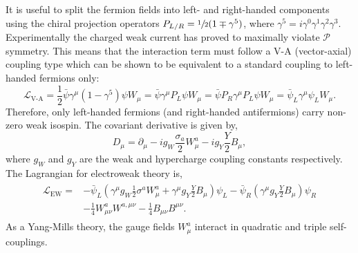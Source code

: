 It is useful to split the fermion fields into left- and right-handed components using the chiral projection operators $P_{L/R} = \sfrac{1}{2} (1 \mp \gamma^5)$, where $\gamma^5 = i \gamma^0 \gamma^1 \gamma^2 \gamma^3$.
Experimentally the charged weak current has proved to maximally violate $\mathcal{P}$ symmetry.
This means that the interaction term must follow a V-A (vector-axial) coupling type which can be shown to be equivalent to a standard coupling to left-handed fermions only:
\begin{equation}
	\label{eq:v-a_coupling}
	\mathcal{L}_\text{V-A}
	= \frac{1}{2} \bar \psi \gamma^\mu (1 - \gamma^5) \psi W_\mu
	= \bar \psi \gamma^\mu P_L \psi W_\mu
	= \bar \psi P_R \gamma^\mu P_L \psi W_\mu
	= \bar \psi_L \gamma^\mu \psi_L W_\mu.
\end{equation}
Therefore, only left-handed fermions (and right-handed antifermions) carry non-zero weak isospin.
The covariant derivative is given by,
\begin{equation}
	\label{eq:ew_covariant_derivative}
	D_\mu = \partial_\mu - i g_W \frac{\sigma_a}{2} W_\mu^a - i g_Y \frac{Y}{2} B_\mu,
\end{equation}
where $g_W$ and $g_Y$ are the weak and hypercharge coupling constants respectively.
The Lagrangian for electroweak theory is,
\begin{align}
	\begin{split}
		\label{eq:ew_lagrangian}
		\mathcal{L}_\text{EW} = & - \bar{\psi}_L \left( \gamma^\mu g_W \frac{1}{2} \sigma^a W^a_\mu + \gamma^\mu g_Y \frac{Y}{2} B_\mu \right) \psi_L - \bar{\psi}_R \left( \gamma^\mu g_Y \frac{Y}{2} B_\mu \right) \psi_R \\
		                        & - \frac{1}{4} W_{\mu\nu}^a W^{a,\mu\nu} - \frac{1}{4} B_{\mu\nu} B^{\mu\nu}.
	\end{split}
\end{align}
As a Yang-Mills theory, the gauge fields $W_\mu^a$ interact in quadratic and triple self-couplings.

